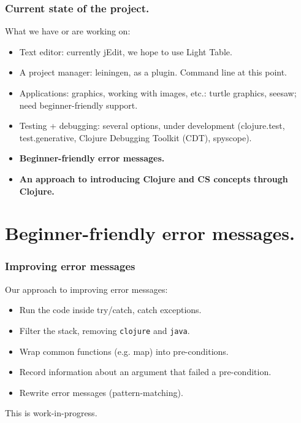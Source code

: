\documentclass{beamer}
\begin{document}
\begin{frame}
  \frametitle{Current state of the project.}
What we have or are working on:
\begin{itemize}
\item Text editor: currently jEdit, we hope to use Light Table. 
\item A project manager: leiningen, as a plugin. Command line at this point. 
\item Applications: graphics, working with images, etc.: turtle graphics, seesaw; need beginner-friendly support.
\item Testing + debugging: several options, under development (clojure.test, test.generative, Clojure Debugging Toolkit (CDT), spyscope).
\item{\bf  Beginner-friendly error messages.}
\item {\bf An approach to introducing Clojure and CS concepts through Clojure. }
\end{itemize}
\end{frame}

\section{Beginner-friendly error messages.}

\begin{frame}
  \frametitle{Improving error messages}
Our approach to improving error messages:
\begin{itemize}
\item Run the code inside try/catch, catch exceptions. 
\item Filter the stack, removing {\tt clojure} and {\tt java}. 
\item Wrap common functions (e.g. map) into pre-conditions. 
\item Record information about an argument that failed a pre-condition.
\item Rewrite error messages (pattern-matching). 
\end{itemize}
This is work-in-progress. 
\end{frame}


\end{document}
